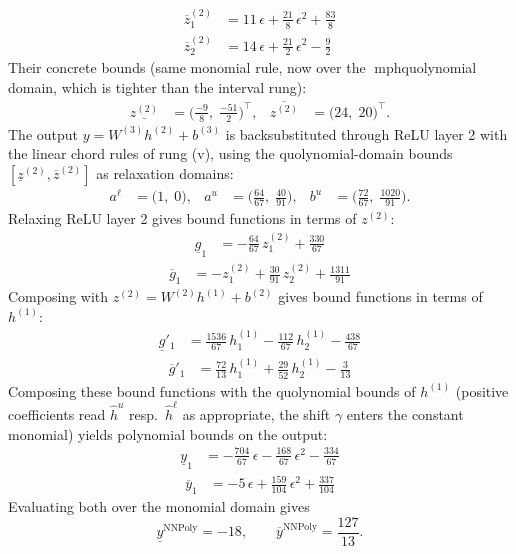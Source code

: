 \documentclass[11pt]{article}
\begin{document}
\begin{align*}
\overline{z}^{(2)}_{1} &= 11\,\epsilon + \frac{21}{8}\,\epsilon^2 + \frac{83}{8} \\
\overline{z}^{(2)}_{2} &= 14\,\epsilon + \frac{21}{2}\,\epsilon^2 - \frac{9}{2}
\end{align*}
Their concrete bounds (same monomial rule, now over the mph{quolynomial} domain, which is tighter than the interval rung):
\begin{align*}
\underline{z^{(2)}} &= \bigl(\frac{-9}{8},\; \frac{-51}{2}\bigr)^{\!\top}, & \overline{z^{(2)}} &= \bigl(24,\; 20\bigr)^{\!\top}.
\end{align*}
The output $y = W^{(3)} h^{(2)} + b^{(3)}$ is backsubstituted through ReLU layer 2 with the linear chord rules of rung (v), using the quolynomial-domain bounds
$[\underline{z}^{(2)}, \overline{z}^{(2)}]$ as relaxation domains:
\begin{align*}
a^{\ell} &= \bigl(1,\; 0\bigr), & a^{u} &= \bigl(\frac{64}{67},\; \frac{40}{91}\bigr), & b^{u} &= \bigl(\frac{72}{67},\; \frac{1020}{91}\bigr).
\end{align*}
Relaxing ReLU layer 2 gives bound functions in terms of $z^{(2)}$:
\begin{align*}
\underline{g}_{1} &= -\frac{64}{67}\,z^{(2)}_{1} + \frac{330}{67}
\end{align*}
\begin{align*}
\overline{g}_{1} &= -z^{(2)}_{1} + \frac{30}{91}\,z^{(2)}_{2} + \frac{1311}{91}
\end{align*}
Composing with $z^{(2)} = W^{(2)} h^{(1)} + b^{(2)}$ gives bound functions in terms of $h^{(1)}$:
\begin{align*}
\underline{g}'_{1} &= \frac{1536}{67}\,h^{(1)}_{1} - \frac{112}{67}\,h^{(1)}_{2} - \frac{438}{67}
\end{align*}
\begin{align*}
\overline{g}'_{1} &= \frac{72}{13}\,h^{(1)}_{1} + \frac{29}{52}\,h^{(1)}_{2} - \frac{3}{13}
\end{align*}
Composing these bound functions with the quolynomial bounds of $h^{(1)}$ (positive
coefficients read $\hat{h}^{u}$ resp.\ $\hat{h}^{\ell}$ as appropriate, the shift $\gamma$ enters the
constant monomial) yields polynomial bounds on the output:
\begin{align*}
\underline{y}_{1} &= -\frac{704}{67}\,\epsilon - \frac{168}{67}\,\epsilon^2 - \frac{334}{67}
\end{align*}
\begin{align*}
\overline{y}_{1} &= -5\,\epsilon + \frac{159}{104}\,\epsilon^2 + \frac{337}{104}
\end{align*}
Evaluating both over the monomial domain gives
\begin{equation*}
\underline{y}^{\text{NNPoly}} = -18, \qquad \overline{y}^{\text{NNPoly}} = \frac{127}{13}.
\end{equation*}
\end{document}
